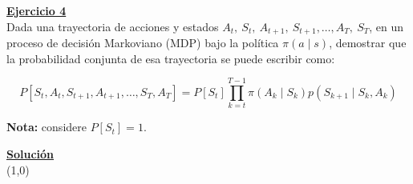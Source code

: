 \indent\underline{\textbf{Ejercicio 4}}\\
Dada una trayectoria de acciones y estados $A_t,\ S_t,\ A_{t+1},\ S_{t+1}, \ldots, A_T,\ S_T$, en un proceso de decisión Markoviano (MDP) bajo la política $\pi(a \mid s)$, demostrar que la probabilidad conjunta de esa trayectoria se puede escribir como:

\[
    P[S_t,A_t,S_{t+1},A_{t+1},\ldots,S_T,A_T] = P[S_t] \prod_{k=t}^{T-1} \pi(A_k \mid S_k) p(S_{k+1} \mid S_k, A_k)
\]

\textbf{Nota:} considere $P[S_t]=1$.

\indent\underline{\textbf{Solución}}\\

\line(1,0){\textwidth}
